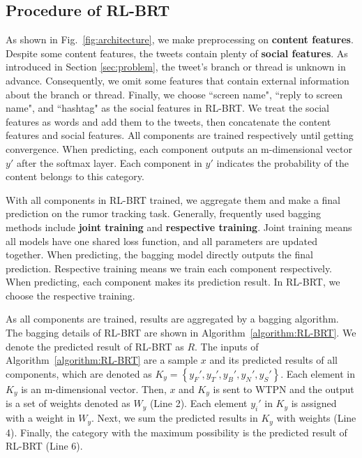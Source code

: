 \subsection{Procedure of RL-BRT}
As shown in Fig.~\ref{fig:architecture}, we make preprocessing on \textbf{content features}. Despite some content features, the tweets contain plenty of \textbf{social features}. As introduced in Section \ref{sec:problem}, the tweet's branch or thread is unknown in advance. Consequently, we omit some features that contain external information about the branch or thread. Finally, we choose ``screen name", ``reply to screen name", and ``hashtag" as the social features in RL-BRT. We treat the social features as words and add them to the tweets, then concatenate the content features and social features. All components are trained respectively until getting convergence. When predicting, each component outputs an m-dimensional vector $y'$ after the softmax layer. Each component in $y'$ indicates the probability of the content belongs to this category. 

With all components in RL-BRT trained, we aggregate them and make a final prediction on the rumor tracking task. Generally, frequently used bagging methods include \textbf{joint training} and \textbf{respective training}. Joint training means all models have one shared loss function, and all parameters are updated together. When predicting, the bagging model directly outputs the final prediction. Respective training means we train each component respectively. When predicting, each component makes its prediction result. In RL-BRT, we choose the respective training. 

As all components are trained, results are aggregated by a bagging algorithm. The bagging details of RL-BRT are shown in Algorithm~\ref{algorithm:RL-BRT}. We denote the predicted result of RL-BRT as $R$. The inputs of Algorithm~\ref{algorithm:RL-BRT} are a sample $x$ and its predicted results of all components, which are denoted as $K_y = \left\{y_F', y_T', y_B', y_N', y_S' \right\}$. Each element in $K_y$ is an m-dimensional vector. Then, $x$ and $K_y$ is sent to WTPN and the output is a set of weights denoted as $W_y$ (Line 2). Each element $y_i'$ in $K_y$ is assigned with a weight in $W_y$. Next, we sum the predicted results in $K_y$ with weights (Line 4). Finally, the category with the maximum possibility is the predicted result of RL-BRT (Line 6). 

